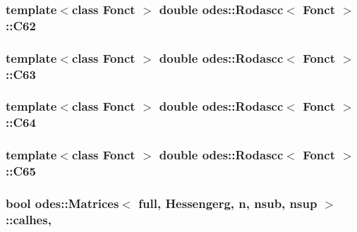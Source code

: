 \hypertarget{classodes_1_1Rodascc_a712f7889a049a3c6cd4347a23b358636}{
\subsubsection[{C62}]{\setlength{\rightskip}{0pt plus 5cm}template$<$class Fonct $>$ double {\bf odes\-::\-Rodascc}$<$ Fonct $>$\-::C62\hspace{0.3cm}{\ttfamily [private]}}}\label{classodes_1_1Rodascc_a712f7889a049a3c6cd4347a23b358636}
\hypertarget{classodes_1_1Rodascc_a2fb142e064cac0a6848b0cbc5f75bb19}{
\subsubsection[{C63}]{\setlength{\rightskip}{0pt plus 5cm}template$<$class Fonct $>$ double {\bf odes\-::\-Rodascc}$<$ Fonct $>$\-::C63\hspace{0.3cm}{\ttfamily [private]}}}\label{classodes_1_1Rodascc_a2fb142e064cac0a6848b0cbc5f75bb19}
\hypertarget{classodes_1_1Rodascc_af26432aa3ab5bccfa137f1b7a9e3d1ff}{
\subsubsection[{C64}]{\setlength{\rightskip}{0pt plus 5cm}template$<$class Fonct $>$ double {\bf odes\-::\-Rodascc}$<$ Fonct $>$\-::C64\hspace{0.3cm}{\ttfamily [private]}}}\label{classodes_1_1Rodascc_af26432aa3ab5bccfa137f1b7a9e3d1ff}
\hypertarget{classodes_1_1Rodascc_aad0e47ae7a3aa22af30f57757532a538}{
\subsubsection[{C65}]{\setlength{\rightskip}{0pt plus 5cm}template$<$class Fonct $>$ double {\bf odes\-::\-Rodascc}$<$ Fonct $>$\-::C65\hspace{0.3cm}{\ttfamily [private]}}}\label{classodes_1_1Rodascc_aad0e47ae7a3aa22af30f57757532a538}
\hypertarget{classodes_1_1Matrices_a82e935680c27f58bcff8a559700411c6}{
\subsubsection[{calhes}]{\setlength{\rightskip}{0pt plus 5cm}bool {\bf odes\-::\-Matrices}$<$ full, Hessengerg, {\bf n}, nsub, {\bf nsup} $>$\-::calhes\hspace{0.3cm}{\ttfamily [protected]}, {\ttfamily [inherited]}}}\label{classodes_1_1Matrices_a82e935680c27f58bcff8a559700411c6}
